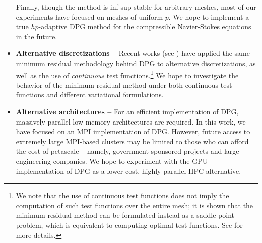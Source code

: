 \begin{itemize}
Finally, though the method is inf-sup stable for arbitrary meshes, most of our experiments have focused on meshes of uniform $p$.  We hope to implement a true $hp$-adaptive DPG method for the compressible Navier-Stokes equations in the future.  
\item \textbf{Alternative discretizations --} Recent works (see \cite{DahmenVariationalStabilization, broersenStevenson, primalDPG, H1DPG}) have applied the same minimum residual methodology behind DPG to alternative discretizations, as well as the use of \textit{continuous} test functions.\footnote{We note that the use of continuous test functions does not imply the computation of such test functions over the entire mesh; it is shown that the minimum residual method can be formulated instead as a saddle point problem, which is equivalent to computing optimal test functions.  See \cite{DahmenVariationalStabilization, H1DPG} for more details.}  We hope to investigate the behavior of the minimum residual method under both continuous test functions and different variational formulations. 
\item \textbf{Alternative architectures --} For an efficient implementation of DPG, massively parallel low memory architectures are required.  In this work, we have focused on an MPI implementation of DPG.  However, future access to extremely large MPI-based clusters may be limited to those who can afford the cost of petascale -- namely, government-sponsored projects and large engineering companies.  We hope to experiment with the GPU implementation of DPG as a lower-cost, highly parallel HPC alternative.  
\end{itemize}